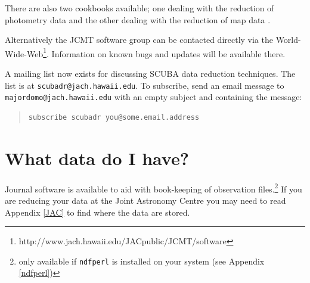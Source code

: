 \documentclass[twoside,11pt]{article}
\newenvironment{myquote}{\begin{quote}\begin{small}}{\end{small}\end{quote}}
\newcommand{\htmladdnormallinkfoot}[2]{#1\footnote{#2}}
\newcommand{\htmladdnormallink}[2]{#1}
\newcommand{\xlabel}[1]{}
\renewcommand{\_}{\texttt{\symbol{95}}}
\begin{document}
There are also two cookbooks available; one dealing with the reduction of
photometry data \cite{S97} and the other dealing with the reduction of
map data \cite{SANDELL97}.

Alternatively the JCMT software group can be contacted directly via the
\htmladdnormallinkfoot{World-Wide-Web}{http://www.jach.hawaii.edu/JACpublic/JCMT/software}.
Information on known bugs and updates will be available there.

A mailing list now exists for discussing SCUBA data reduction techniques.  The
list is at
\htmladdnormallink{\texttt{scubadr@jach.hawaii.edu}}{mailto:scubadr@jach.hawaii.edu}. To
subscribe, send an email message to
\htmladdnormallink{\texttt{majordomo@jach.hawaii.edu}}{mailto:majordomo@jach.hawaii.edu}
with an empty subject and containing the message:
\begin{myquote}
\begin{verbatim}
subscribe scubadr you@some.email.address
\end{verbatim}
\end{myquote}


\section{\xlabel{journal}What data do I have?\label{journal}}

Journal software is available to aid with book-keeping of observation
files.\footnote{only available if {\tt ndfperl} is installed on your system
(see Appendix \ref{ndfperl})}  If you are reducing your data at the Joint
Astronomy Centre you may need to read Appendix \ref{JAC} to find where the
data are stored.
\end{document}
